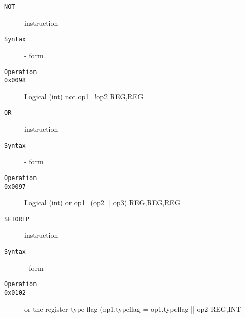 \clearpage
\begin{description}
\item[\texttt{NOT}] instruction\\
\item[\texttt{Syntax}] - form \\

\item[\texttt{Operation}]
\item[\texttt{}]
\item[\texttt{0x0098}] Logical (int) not op1=!op2  {REG,REG}           \\
\end{description}
\clearpage
\begin{description}
\item[\texttt{OR}] instruction\\
\item[\texttt{Syntax}] - form \\

\item[\texttt{Operation}]
\item[\texttt{}]
\item[\texttt{0x0097}] Logical (int) or op1=(op2 || op3)  {REG,REG,REG}       \\
\end{description}
\clearpage
\begin{description}
\item[\texttt{SETORTP}] instruction\\
\item[\texttt{Syntax}] - form \\

\item[\texttt{Operation}]
\item[\texttt{}]
\item[\texttt{0x0102}] or the register type flag (op1.typeflag = op1.typeflag || op2  {REG,INT}           \\
\end{description}
